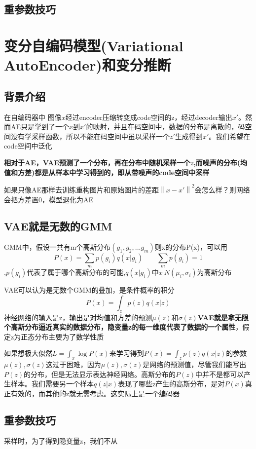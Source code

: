 \documentclass[12pt, a4paper, oneside]{ctexart}
\begin{document}
\subsection{重参数技巧}

\section{变分自编码模型(Variational AutoEncoder)和变分推断}
\subsection{背景介绍}
在自编码器中 图像$x$经过encoder压缩转变成code空间的z，经过decoder输出$x'$。然而AE只是学到了一个$x$到$x'$的映射，并且在码空间中，数据的分布是离散的，码空间没有学采样函数，所以不能在码空间中虽以采样一个$z'$生成得到$x'$。我们希望在code空间中泛化
\par
\textbf{相对于AE，VAE预测了一个分布，再在分布中随机采样一个$z$,而噪声的分布(均值和方差)都是从样本中学习得到的，即从带噪声的code空间中采样}
\par
如果只像AE那样去训练重构图片和原始图片的差距${\left\| x-x'   \right\|}^2$会怎么样？则网络会把方差置0，模型退化为AE



\subsection{VAE就是无数的GMM}
GMM中，假设一共有m个高斯分布$(g_1,g_2,...g_m)$则x的分布P(x)，可以用$$P(x)=\sum_{m}p(g_i)q(x|g_i)\qquad \sum_{m}p(g_i)=1$$,$p(g_i)$代表了属于哪个高斯分布的可能,$q(x|g_i)$中$x~N(\mu_i,\sigma_i)$为高斯分布 
\par
VAE可以认为是无数个GMM的叠加，是条件概率的积分$$P(x)=\int_z{p(z)q(x|z)}$$神经网络的输入是z，输出是对均值和方差的预测$\mu(z)$和$\sigma(z)$\textbf{VAE就是拿无限个高斯分布逼近真实的数据分布，隐变量z的每一维度代表了数据的一个属性}，假定z为正态分布主要为了数学性质
\par
如果想极大似然$L=\int_x{\log P(x)}$来学习得到$P(x)=\int_z{p(z)q(x|z)}$的参数$\mu(z),\sigma(z)$这过于困难，因为$\mu(z),\sigma(z)$是网络的预测值，尽管我们能写出$P(z)$的分布，但是无法显示表达神经网络。高斯分布的$P(z)$中并不是都可以产生样本。我们需要另一个样本$q(z|x)$表现了哪些z产生的高斯分布，是对$P(x)$真正有效的，而其他的z就无需考虑。这实际上是一个编码器

\subsection{重参数技巧}
\par
采样时，为了得到隐变量z，我们不从
\end{document}
